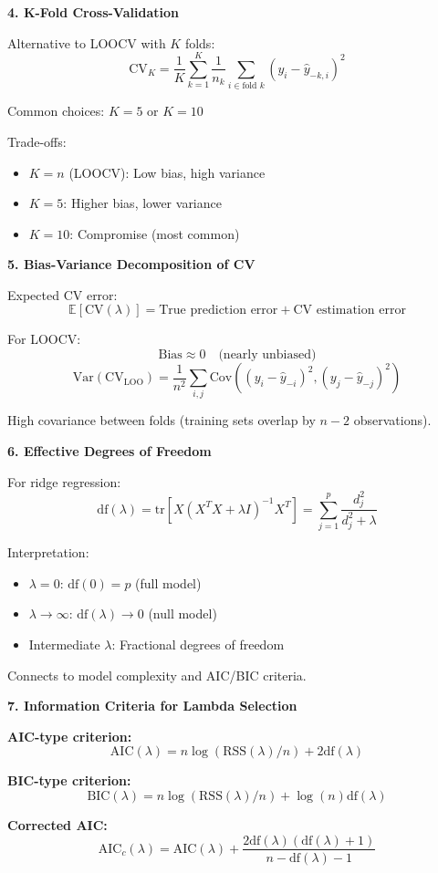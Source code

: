 \documentclass[12pt]{article}
\begin{document}
\begin{explanation}
\textbf{4. K-Fold Cross-Validation}

Alternative to LOOCV with $K$ folds:
\[\text{CV}_K = \frac{1}{K}\sum_{k=1}^{K}\frac{1}{n_k}\sum_{i \in \text{fold } k}(y_i - \hat{y}_{-k,i})^2\]

Common choices: $K = 5$ or $K = 10$

Trade-offs:
\begin{itemize}
\item $K = n$ (LOOCV): Low bias, high variance
\item $K = 5$: Higher bias, lower variance
\item $K = 10$: Compromise (most common)
\end{itemize}

\textbf{5. Bias-Variance Decomposition of CV}

Expected CV error:
\[\mathbb{E}[\text{CV}(\lambda)] = \text{True prediction error} + \text{CV estimation error}\]

For LOOCV:
\[\text{Bias} \approx 0 \quad \text{(nearly unbiased)}\]
\[\text{Var}(\text{CV}_{\text{LOO}}) = \frac{1}{n^2}\sum_{i,j}\text{Cov}((y_i - \hat{y}_{-i})^2, (y_j - \hat{y}_{-j})^2)\]

High covariance between folds (training sets overlap by $n-2$ observations).

\textbf{6. Effective Degrees of Freedom}

For ridge regression:
\[\text{df}(\lambda) = \text{tr}[X(X^TX + \lambda I)^{-1}X^T] = \sum_{j=1}^{p}\frac{d_j^2}{d_j^2 + \lambda}\]

Interpretation:
\begin{itemize}
\item $\lambda = 0$: $\text{df}(0) = p$ (full model)
\item $\lambda \to \infty$: $\text{df}(\lambda) \to 0$ (null model)
\item Intermediate $\lambda$: Fractional degrees of freedom
\end{itemize}

Connects to model complexity and AIC/BIC criteria.

\textbf{7. Information Criteria for Lambda Selection}

\textbf{AIC-type criterion:}
\[\text{AIC}(\lambda) = n\log(\text{RSS}(\lambda)/n) + 2\text{df}(\lambda)\]

\textbf{BIC-type criterion:}
\[\text{BIC}(\lambda) = n\log(\text{RSS}(\lambda)/n) + \log(n)\text{df}(\lambda)\]

\textbf{Corrected AIC:}
\[\text{AIC}_c(\lambda) = \text{AIC}(\lambda) + \frac{2\text{df}(\lambda)(\text{df}(\lambda) + 1)}{n - \text{df}(\lambda) - 1}\]


\end{explanation}
\end{document}

